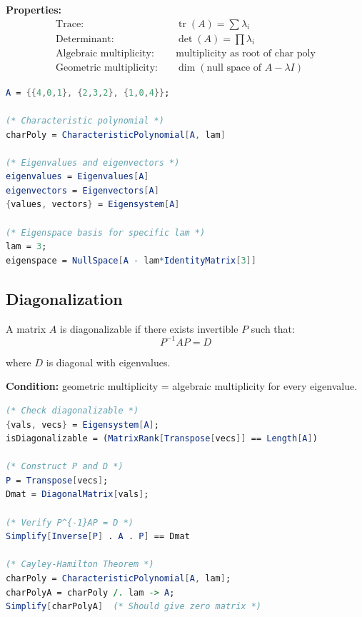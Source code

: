\documentclass[12pt,a4paper]{article}
\providecommand{\tr}{\operatorname{tr}}
\begin{document}
\begin{formulabox}
    \textbf{Properties:}
    \begin{align*}
    \text{Trace:} &\quad \tr(A) = \sum \lambda_i \\
    \text{Determinant:} &\quad \det(A) = \prod \lambda_i \\
    \text{Algebraic multiplicity:} &\quad \text{multiplicity as root of char poly} \\
    \text{Geometric multiplicity:} &\quad \dim(\text{null space of } A - \lambda I)
    \end{align*}
\end{formulabox}

\begin{mathematicabox}
    \begin{lstlisting}[language=Mathematica, basicstyle=\ttfamily\small]
A = {{4,0,1}, {2,3,2}, {1,0,4}};

(* Characteristic polynomial *)
charPoly = CharacteristicPolynomial[A, lam]

(* Eigenvalues and eigenvectors *)
eigenvalues = Eigenvalues[A]
eigenvectors = Eigenvectors[A]
{values, vectors} = Eigensystem[A]

(* Eigenspace basis for specific lam *)
lam = 3;
eigenspace = NullSpace[A - lam*IdentityMatrix[3]]
    \end{lstlisting}
\end{mathematicabox}

\subsection{Diagonalization}

\begin{definitionbox}[Diagonalization]
    A matrix \(A\) is diagonalizable if there exists invertible \(P\) such that:
    \[ P^{-1}AP = D \]
    
    where \(D\) is diagonal with eigenvalues.
    
    \textbf{Condition:} geometric multiplicity = algebraic multiplicity for every eigenvalue.
\end{definitionbox}

\begin{mathematicabox}
    \begin{lstlisting}[language=Mathematica, basicstyle=\ttfamily\small]
(* Check diagonalizable *)
{vals, vecs} = Eigensystem[A];
isDiagonalizable = (MatrixRank[Transpose[vecs]] == Length[A])

(* Construct P and D *)
P = Transpose[vecs];
Dmat = DiagonalMatrix[vals];

(* Verify P^{-1}AP = D *)
Simplify[Inverse[P] . A . P] == Dmat

(* Cayley-Hamilton Theorem *)
charPoly = CharacteristicPolynomial[A, lam];
charPolyA = charPoly /. lam -> A;
Simplify[charPolyA]  (* Should give zero matrix *)
    \end{lstlisting}
\end{mathematicabox}
\end{document}

